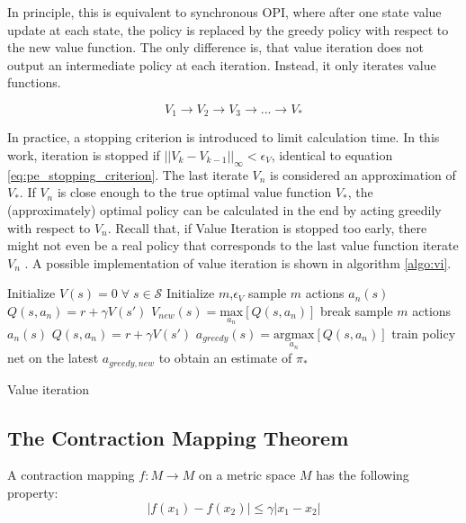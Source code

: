 In principle, this is equivalent to synchronous OPI, where after one state value update at each state, the policy is replaced by the greedy policy with respect to the new value function. The only difference is, that value iteration does not output an intermediate policy at each iteration. Instead, it only iterates value functions. 

\begin{equation*}
V_1 \longrightarrow V_2 \longrightarrow V_3 \longrightarrow ... \longrightarrow  V_*
\label{eq:vi_scheme}
\end{equation*}

In practice, a stopping criterion is introduced to limit calculation time. In this work, iteration is stopped if $||V_{k}-V_{k-1}||_\infty<\epsilon_V$, identical to equation \ref{eq:pe_stopping_criterion}. The last iterate $V_n$ is considered an approximation of $V_*$. If $V_n$ is close enough to the true optimal value function $V_*$, the (approximately) optimal policy can be calculated in the end by acting greedily with respect to $V_n$. Recall that, if Value Iteration is stopped too early, there might not even be a real policy that corresponds to the last value function iterate $V_n$ \cite[lecture~3]{Silver2015}. A possible implementation of value iteration is shown in algorithm \ref{algo:vi}.

\begin{algorithm}[hbt]
	\begin{algorithmic}[0] %
		\State Initialize $V(s) = 0 \; \forall \; s \in \mathcal{S}$
		\State Initialize $m$,\;$\epsilon_V$
		\State sample $m$ actions $a_n(s)$
		\State $Q(s,a_n) = r + \gamma V(s')$
		\EndFor		
		\State $V_{new}(s)=\underset{a_n}{\text{max}}[Q(s,a_n)]$
		\EndFor
		\State break
		\EndIf
		\EndWhile
		\State sample $m$ actions $a_n(s)$
		\State $Q(s,a_n) = r + \gamma V(s')$
		\EndFor
		\State $a_{greedy}(s)=\underset{a_n}{\text{argmax}}[Q(s,a_n)]$
		\EndFor
		\EndFunction
		\State train policy net on the latest $a_{greedy,new}$ to obtain an estimate of $\pi_*$
		\EndFunction
	\end{algorithmic}	
	\caption{Value iteration}
	\label{algo:vi}
\end{algorithm}

\subsection{The Contraction Mapping Theorem}
\label{sec:contraction_mappings}
A contraction mapping $f: M \to M$ on a metric space $M$ has the following property:
\begin{equation}
|f(x_1)-f(x_2)| \leq \gamma |x_1-x_2|
\end{equation}

